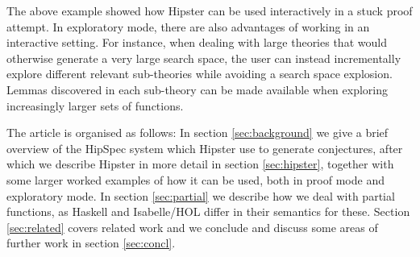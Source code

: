 The above example showed how Hipster can be used interactively in a stuck proof attempt. In exploratory mode, there are also advantages of working in an interactive setting. For instance, when dealing with large theories that would otherwise generate a very large search space, the user can instead incrementally explore different relevant sub-theories while avoiding a search space explosion. Lemmas discovered in each sub-theory can be made available when exploring increasingly larger sets of functions. 

The article is organised as follows: In section \ref{sec:background} we give a brief overview of the HipSpec system which Hipster use to generate conjectures, after which we describe Hipster in more detail in section \ref{sec:hipster}, together with some larger worked examples of how it can be used, both in proof mode and exploratory mode. In section \ref{sec:partial} we describe how we deal with partial functions, as Haskell and Isabelle/HOL differ in their semantics for these. Section \ref{sec:related} covers related work and we conclude and discuss some areas of further work in section \ref{sec:concl}. 
